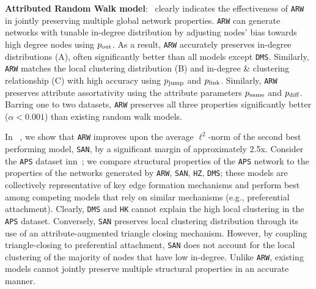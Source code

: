 \textbf{Attributed Random Walk model}:~ clearly indicates the effectiveness
of \texttt{ARW} in {jointly} preserving multiple
global network properties. \texttt{ARW} can generate networks with tunable
in-degree distribution by adjusting nodes' bias towards high degree nodes
using $p_{\scriptsize\mbox{out}}$. As a result, \texttt{ARW} accurately preserves
in-degree distributions (A), often significantly better
than all models except \texttt{DMS}. Similarly, \texttt{ARW} matches the local clustering
distribution  (B) and in-degree \& clustering relationship
(C) with high accuracy using $p_{\scriptsize\mbox{jump}}$ and
$p_{\scriptsize\mbox{link}}$. Similarly, \texttt{ARW} preserves attribute assortativity using
the attribute parameters $p_{\scriptsize\mbox{same}}$ and $p_{\scriptsize\mbox{diff}}$.
Barring one to two datasets, \texttt{ARW} preserves all three properties significantly
better ($\alpha < 0.001$) than existing random walk models.


In ~, we show that \texttt{ARW} improves upon the average $\ell^2$-norm
of the second best performing model, \texttt{SAN}, by a significant margin of approximately 2.5x.
Consider the \texttt{APS} dataset inn~;
we compare structural properties of the \texttt{APS} network to the properties of the networks
generated by \texttt{ARW}, \texttt{SAN}, \texttt{HZ}, \texttt{DMS}; these models are collectively
representative of key edge formation mechanisms and perform best among competing models that rely on
similar mechanisms (e.g., preferential attachment). Clearly, \texttt{DMS} and \texttt{HK}
cannot explain the high local clustering in the \texttt{APS} dataset.
Conversely, \texttt{SAN} preserves local clustering distribution through its use of an attribute-augmented
triangle closing mechanism. However, by coupling triangle-closing to preferential attachment, \texttt{SAN} does not account
for the local clustering of the majority of nodes that have low in-degree.
Unlike \texttt{ARW}, existing models cannot jointly preserve multiple structural properties in
an accurate manner.




